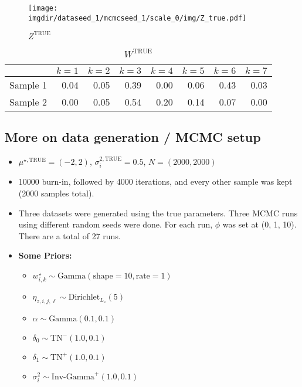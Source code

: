 \documentclass[10pt]{article} %
\newcommand{\Gam}{ \text{Gamma} }
\newcommand{\InvGamma}{ \text{Inv-Gamma} }
\def\Dir{\text{Dirichlet}}
\def\TN{\text{TN}}
\def\true{\text{TRUE}}
\def\imgdir{../../results/test-sim-6-6/}
\begin{document}
\begin{figure}[H]
  \begin{center}  %
    \texttt{[image: \\imgdir/dataseed\_1/mcmcseed\_1/scale\_0/img/Z\_true.pdf]}
  \end{center}
  \caption{$Z^\true$}
  \label{fig:Z-true}
\end{figure}

\begin{table}[ht]
  \centering
  \begin{tabular}{rrrrrrrr}
    \hline
    & $k=1$ & $k=2$ & $k=3$ & $k=4$ & $k=5$ & $k=6$ & $k=7$ \\
    \hline
    Sample 1 & 0.04 & 0.05 & 0.39 & 0.00 & 0.06 & 0.43 & 0.03 \\
    Sample 2 & 0.00 & 0.05 & 0.54 & 0.20 & 0.14 & 0.07 & 0.00 \\
    \hline
  \end{tabular}
  \caption{$W^\true$}
  \label{tab:W-true}
\end{table}

\subsection{More on data generation / MCMC setup}
\begin{itemize}
  \item $\mu^{\star,\true}=(-2, 2)$, $\sigma^{2,\true}_i=0.5$, $N=(2000, 2000)$
  \item 10000 burn-in, followed by 4000 iterations, and every other sample was
    kept (2000 samples total).
  \item Three datasets were generated using the true parameters. Three MCMC runs using 
    different random seeds were done. For each run, $\phi$ was set at (0, 1, 10). There
    are a total of 27 runs.
  \item \textbf{Some Priors:}
  \begin{itemize}
    \item $w^\star_{i,k} \sim \Gam(\text{shape}=10, \text{rate}=1)$
    \item $\eta_{z, i,j,\ell} \sim \Dir_{L_z}(5)$
    \item $\alpha \sim \Gam(0.1, 0.1)$
    \item $\delta_0 \sim \TN^-(1.0, 0.1)$
    \item $\delta_1 \sim \TN^+(1.0, 0.1)$
    \item $\sigma^2_i \sim \InvGamma^+(1.0, 0.1)$
  \end{itemize}
\end{itemize}
\end{document}
